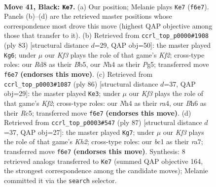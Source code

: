 \documentclass[11pt]{article}
\begin{document}
\clearpage

\begin{figure}[p]\centering
\begin{subfigure}{0.46\textwidth}\centering
\resizebox{\linewidth}{!}{%
\newchessgame
\chessboard[
  setfen={3r4/p7/Pp3k1b/5p2/2B1pP1n/8/5K2/1RB5 b - - 15 41},
  showmover=false,
  pgfstyle=straightmove, color=movearrow, markmove={f6-e7}
]}
\caption{}
\end{subfigure}\hfill
\begin{subfigure}{0.46\textwidth}\centering
\resizebox{\linewidth}{!}{%
\newchessgame
\chessboard[
  setfen={7R/p4k2/1b2p3/1b1pB1pp/3P4/1P2K3/8/8 b - - 1 42},
  showmover=false,
  pgfstyle=straightmove, color=movearrow, markmove={f7-g6}
]}
\caption{}
\end{subfigure}
\\[4pt]
\begin{subfigure}{0.46\textwidth}\centering
\resizebox{\linewidth}{!}{%
\newchessgame
\chessboard[
  setfen={8/3k4/6p1/p1R1PbNp/r7/7P/5KP1/8 w - - 10 44},
  showmover=false,
  pgfstyle=straightmove, color=movearrow, markmove={f2-e3}
]}
\caption{}
\end{subfigure}\hfill
\begin{subfigure}{0.46\textwidth}\centering
\resizebox{\linewidth}{!}{%
\newchessgame
\chessboard[
  setfen={8/R3Bp1k/6p1/3b3p/7P/5P2/2r3P1/6K1 b - - 4 44},
  showmover=false,
  pgfstyle=straightmove, color=movearrow, markmove={h7-g7}
]}
\caption{}
\end{subfigure}
\caption{\textbf{Move 41, Black: \texttt{Ke7}.} (a) Our position; Melanie plays \texttt{Ke7} (\texttt{f6e7}). Panels (b)--(d) are the retrieved master positions whose correspondence most drove this move (highest QAP objective among those that transfer to it). (b) Retrieved from \texttt{ccrl\_top\_p0000\#1908} (ply 83) [structural distance $d$=29, QAP obj=50]: the master played \texttt{Kg6}; under $\mu$ our \emph{Kf3} plays the role of that game's \emph{Kf2}; cross-type roles: our \emph{R}d8 as their \emph{B}b5, our \emph{N}h4 as their \emph{P}g5; transferred move \texttt{f6e7} \textbf{(endorses this move)}. (c) Retrieved from \texttt{ccrl\_top\_p0003\#1087} (ply 86) [structural distance $d$=37, QAP obj=29]: the master played \texttt{Ke3}; under $\mu$ our \emph{Kf3} plays the role of that game's \emph{Kf2}; cross-type roles: our \emph{N}h4 as their \emph{r}a4, our \emph{B}h6 as their \emph{R}c5; transferred move \texttt{f6e7} \textbf{(endorses this move)}. (d) Retrieved from \texttt{ccrl\_top\_p0003\#547} (ply 87) [structural distance $d$=37, QAP obj=27]: the master played \texttt{Kg7}; under $\mu$ our \emph{Kf3} plays the role of that game's \emph{Kh2}; cross-type roles: our \emph{b}c1 as their \emph{r}a7; transferred move \texttt{f6e7} \textbf{(endorses this move)}. Synthesis: 8 retrieved analogs transferred to \texttt{Ke7} (summed QAP objective 164, the strongest correspondence among the candidate moves); Melanie committed it via the \texttt{search} selector.}
\label{fig:thought-m81}
\end{figure}
\end{document}
